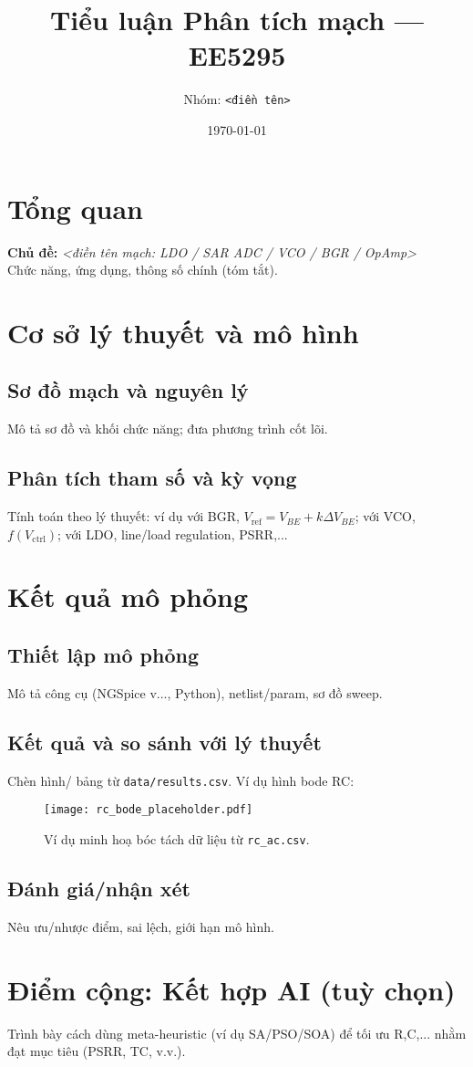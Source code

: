 \documentclass[11pt,a4paper]{article}
\title{Tiểu luận Phân tích mạch --- EE5295}
\author{Nhóm: \texttt{<điền tên>}}
\date{\today}
\begin{document}
\maketitle

\section{Tổng quan}
\textbf{Chủ đề:} \emph{<điền tên mạch: LDO / SAR ADC / VCO / BGR / OpAmp>}\\
Chức năng, ứng dụng, thông số chính (tóm tắt).

\section{Cơ sở lý thuyết và mô hình}
\subsection{Sơ đồ mạch và nguyên lý}
Mô tả sơ đồ và khối chức năng; đưa phương trình cốt lõi.

\subsection{Phân tích tham số và kỳ vọng}
Tính toán theo lý thuyết: ví dụ với BGR, $V_\text{ref} = V_{BE} + k\Delta V_{BE}$; với VCO, $f(V_\text{ctrl})$; với LDO, line/load regulation, PSRR,...

\section{Kết quả mô phỏng}
\subsection{Thiết lập mô phỏng}
Mô tả công cụ (NGSpice v..., Python), netlist/param, sơ đồ sweep.

\subsection{Kết quả và so sánh với lý thuyết}
Chèn hình/ bảng từ \texttt{data/results.csv}. Ví dụ hình bode RC:
\begin{figure}[h]
\centering
\texttt{[image: rc\_bode\_placeholder.pdf]}
\caption{Ví dụ minh hoạ bóc tách dữ liệu từ \texttt{rc\_ac.csv}.}
\end{figure}

\subsection{Đánh giá/nhận xét}
Nêu ưu/nhược điểm, sai lệch, giới hạn mô hình.

\section{Điểm cộng: Kết hợp AI (tuỳ chọn)}
Trình bày cách dùng meta-heuristic (ví dụ SA/PSO/SOA) để tối ưu R,C,... nhằm đạt mục tiêu (PSRR, TC, v.v.).



\end{document}
